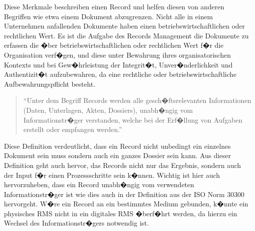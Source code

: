 \documentclass[a4paper,twoside,10pt]{report}
\begin{document}
Diese Merkmale beschreiben einen Record und helfen diesen von anderen Begriffen wie etwa einem Dokument abzugrenzen. Nicht alle in einem Unternehmen anfallenden Dokumente haben einen betriebswirtschaftlichen oder rechtlichen Wert. Es ist die Aufgabe des Records Management die Dokumente zu erfassen die �ber betriebswirtschaftlichen oder rechtlichen Wert f�r die Organisation verf�gen, und diese unter Bewahrung ihres organisatorischen Kontexts und bei Gew�hrleistung der Integrit�t, Unver�nderlichkeit und Authentizit�t aufzubewahren, da eine rechtliche oder betriebswirtschaftliche Aufbewahrungspflicht besteht. \cite{rmprinzipien}

\begin{quote}
"`Unter dem Begriff Records werden alle gesch�ftsrelevanten Informationen (Daten, Unterlagen, Akten, Dossiers), unabh�ngig vom Informationstr�ger verstanden, welche bei der Erf�llung von Aufgaben erstellt oder empfangen werden."'\cite{krm}
\end{quote}

Diese Definition verdeutlicht, dass ein Record nicht unbedingt ein einzelnes Dokument sein muss sondern auch ein ganzes Dossier sein kann. Aus dieser Definition geht auch hervor, das Records nicht nur das Ergebnis, sondern auch der Input f�r einen Prozessschritte sein k�nnen. Wichtig ist hier auch hervorzuheben, dass ein Record unabh�ngig vom verwendeten Informationstr�ger ist wie dies auch in der Definition aus der ISO Norm 30300 hervorgeht. W�re ein Record an ein bestimmtes Medium gebunden, k�nnte ein physisches \ac{RMS} nicht in ein digitales \ac{RMS} �berf�hrt werden, da hierzu ein Wechsel des Informationstr�gers notwendig ist. \cite{krm}
\end{document}

